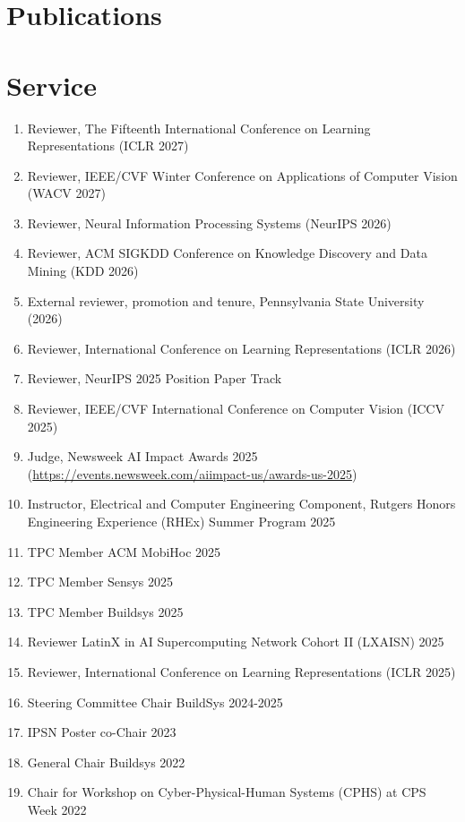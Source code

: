 \documentclass[12pt]{article}
\begin{document}
\section{Publications}


\section{Service}
\begin{enumerate}
    \item Reviewer, The Fifteenth International Conference on Learning Representations (ICLR 2027)
    \item Reviewer, IEEE/CVF Winter Conference on Applications of Computer Vision (WACV 2027)
    \item Reviewer, Neural Information Processing Systems (NeurIPS 2026)
    \item Reviewer, ACM SIGKDD Conference on Knowledge Discovery and Data Mining (KDD 2026)
    \item External reviewer, promotion and tenure, Pennsylvania State University (2026)
    \item Reviewer, International Conference on Learning Representations (ICLR 2026)
    \item Reviewer, NeurIPS 2025 Position Paper Track
    \item Reviewer, IEEE/CVF International Conference on Computer Vision (ICCV 2025)
    \item Judge, Newsweek AI Impact Awards 2025 (\href{https://events.newsweek.com/aiimpact-us/awards-us-2025}{https://events.newsweek.com/aiimpact-us/awards-us-2025})
    \item Instructor, Electrical and Computer Engineering Component, Rutgers Honors Engineering Experience (RHEx) Summer Program 2025
    \item TPC Member ACM MobiHoc 2025
    \item TPC Member Sensys 2025
    \item TPC Member Buildsys 2025
    \item Reviewer LatinX in AI Supercomputing Network Cohort II (LXAISN) 2025
    \item Reviewer, International Conference on Learning Representations (ICLR 2025)
    \item Steering Committee Chair BuildSys 2024-2025
    \item IPSN Poster co-Chair 2023
    \item General Chair Buildsys 2022
    \item Chair for Workshop on Cyber-Physical-Human Systems (CPHS) at CPS Week 2022

\end{enumerate}
\end{document}
